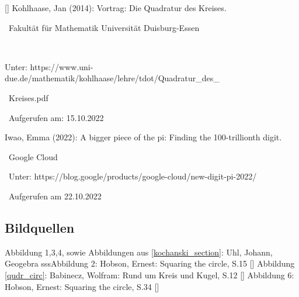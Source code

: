 [\UniPresentationInt] Kohlhaase, Jan (2014): Vortrag: Die Quadratur des Kreises. \par\, Fakultät für Mathematik
Universität Duisburg-Essen \par\, \begin{simplechar}Unter: https://www.uni-due.de/mathematik/kohlhaase/lehre/tdot/Quadratur_des_\par\, Kreises.pdf \par\, Aufgerufen am: 15.10.2022 \end{simplechar}
\newline\newline
[\GoogleCloudInt]  Iwao, Emma (2022): A bigger piece of the pi: Finding the 100-trillionth digit. \par\, Google Cloud \par\, Unter: https://blog.google/products/google-cloud/new-digit-pi-2022/ \par\, Aufgerufen am 22.10.2022
\subsection{Bildquellen}
Abbildung 1,3,4, sowie Abbildungen aus \ref{kochanski_section}: Uhl, Johann, Geogebra \newline
sssAbbildung 2: Hobson, Ernest: Squaring the circle, S.15 [\HobsonInt]\newline
Abbildung \ref{qudr_circ}: Babinecz, Wolfram: Rund um Kreis und Kugel, S.12 [\BabineczInt]\newline
Abbildung 6: Hobson, Ernest: Squaring the circle, S.34 [\HobsonInt]
